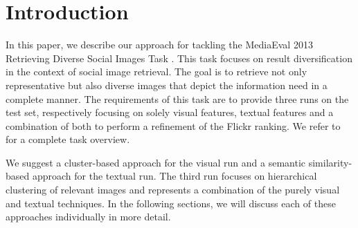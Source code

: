 \documentclass{acm_proc_article-me11_tweaked}
\begin{document}
\section{Introduction}
In this paper, we describe our approach for tackling the MediaEval 2013 Retrieving Diverse Social Images Task \cite{mediaeval-diversephotos}.
This task focuses on result diversification in the context of social image retrieval. 
The goal is to retrieve not only representative but also diverse images that depict the information need in a complete manner.
The requirements of this task are to provide three runs on the test set, respectively focusing on solely visual features, textual features and a combination of both to perform a refinement of the Flickr ranking.
We refer to \cite{mediaeval-diversephotos} for a complete task overview.

We suggest a cluster-based approach for the visual run and a semantic similarity-based approach for the textual run.
The third run focuses on hierarchical clustering of relevant images and represents a combination of the purely visual and textual techniques.
In the following sections, we will discuss each of these approaches individually in more detail.
\end{document}
